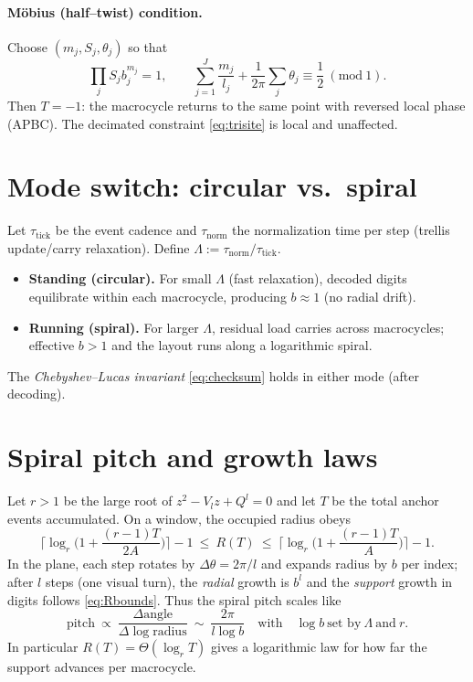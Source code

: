 \documentclass[11pt]{article}
\theoremstyle{definition}
\theoremstyle{remark}
\begin{document}
\paragraph{Möbius (half--twist) condition.} Choose $(m_j,S_j,\theta_j)$ so that
\begin{equation}\label{eq:half}
\prod_j S_j b_j^{m_j}=1,\qquad \sum_{j=1}^J \frac{m_j}{l_j}+ \frac{1}{2\pi}\sum_j \theta_j \equiv \frac12 \ (\mathrm{mod}\ 1).
\end{equation}
Then $T=-1$: the macrocycle returns to the same point with reversed local phase (APBC). The decimated constraint \eqref{eq:trisite} is local and unaffected.

\section{Mode switch: circular vs.\ spiral}
Let $\tau_{\mathrm{tick}}$ be the event cadence and $\tau_{\mathrm{norm}}$ the normalization time per step (trellis update/carry relaxation).
Define $\Lambda:=\tau_{\mathrm{norm}}/\tau_{\mathrm{tick}}$.
\begin{itemize}
\item \textbf{Standing (circular).} For small $\Lambda$ (fast relaxation), decoded digits equilibrate within each macrocycle, producing $b\approx 1$ (no radial drift).
\item \textbf{Running (spiral).} For larger $\Lambda$, residual load carries across macrocycles; effective $b>1$ and the layout runs along a logarithmic spiral.
\end{itemize}
The \emph{Chebyshev--Lucas invariant} \eqref{eq:checksum} holds in either mode (after decoding).

\section{Spiral pitch and growth laws}
Let $r>1$ be the large root of $z^2 - V_l z + Q^l=0$ and let $T$ be the total anchor events accumulated.
On a window, the occupied radius obeys
\begin{equation}\label{eq:Rbounds}
\Big\lceil \log_r\!\Big(1+\frac{(r-1)T}{2A}\Big)\Big\rceil -1 \ \le\ R(T)\ \le\
\Big\lceil \log_r\!\Big(1+\frac{(r-1)T}{A}\Big)\Big\rceil -1.
\end{equation}
In the plane, each step rotates by $\Delta\theta=2\pi/l$ and expands radius by $b$ per index; after $l$ steps (one visual turn),
the \emph{radial} growth is $b^l$ and the \emph{support} growth in digits follows \eqref{eq:Rbounds}. Thus the spiral pitch scales like
\begin{equation}
\text{pitch} \ \propto\ \frac{\Delta\text{angle}}{\Delta \log \text{radius}} \ \sim\ \frac{2\pi}{l\log b}\quad\text{with}\quad \log b\ \text{set by}\ \Lambda\ \text{and}\ r.
\end{equation}
In particular $R(T)=\Theta(\log_r T)$ gives a logarithmic law for how far the support advances per macrocycle.
\end{document}
